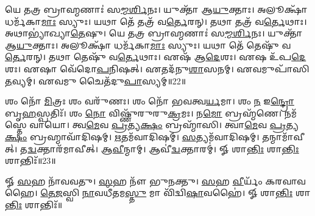 𑌯𑍇 𑌤𑌤𑍍𑌰 𑌬𑍍𑌰𑌾𑌹𑍍𑌮𑌣𑌾𑌃॑ 𑌸\-\ul{𑌮𑍍𑌮}\-\-\ul{𑌰𑍍}\-\mbox{}𑌶𑌿𑌨𑌃। 
𑌯𑍁𑌕𑍍𑌤𑌾᳴ 𑌆\-\ul{𑌯𑍁}\-𑌕𑍍𑌤𑌾𑌃। 
𑌅𑌲𑍂𑌕𑍍𑌷𑌾᳴ 𑌧𑌰𑍍𑌮᳴𑌕𑌾\-\ul{𑌮𑌾𑌃} 𑌸𑍍𑌯𑍁𑌃। 
𑌯𑌥𑌾 𑌤𑍇᳴ 𑌤𑌤𑍍𑌰᳴ 𑌵\-\ul{𑌰𑍍𑌤𑍇}\-𑌰𑌨𑍍। 
𑌤𑌥𑌾 𑌤𑌤𑍍𑌰᳴ 𑌵\-\ul{𑌰𑍍𑌤𑍇}\-𑌥𑌾𑌃। 
𑌅𑌥𑌾𑌭𑍍𑌯𑌾॑𑌖𑍍𑌯𑌾\-\ul{𑌤𑍇}\-𑌷𑍁। 
𑌯𑍇 𑌤𑌤𑍍𑌰 𑌬𑍍𑌰𑌾𑌹𑍍𑌮𑌣𑌾𑌃॑ 𑌸\-\ul{𑌮𑍍𑌮}\-\-\ul{𑌰𑍍}\-\mbox{}𑌶𑌿𑌨𑌃। 
𑌯𑍁𑌕𑍍𑌤𑌾᳴ 𑌆\-\ul{𑌯𑍁}\-𑌕𑍍𑌤𑌾𑌃। 
𑌅𑌲𑍂𑌕𑍍𑌷𑌾᳴ 𑌧𑌰𑍍𑌮᳴𑌕𑌾\-\ul{𑌮𑌾𑌃} 𑌸𑍍𑌯𑍁𑌃। 
𑌯𑌥𑌾 𑌤𑍇᳴ 𑌤𑍇𑌷𑍁᳴ 𑌵\-\ul{𑌰𑍍𑌤𑍇}\-𑌰𑌨𑍍। 
𑌤𑌥𑌾 𑌤𑍇𑌷𑍁᳴ 𑌵\-\ul{𑌰𑍍𑌤𑍇}\-𑌥𑌾𑌃। 
𑌏𑌷᳴ 𑌆\-\ul{𑌦𑍇}\-𑌶𑌃। 
𑌏𑌷 𑌉᳴𑌪\-\ul{𑌦𑍇}\-𑌶𑌃। 
𑌏𑌷𑌾 𑌵𑍇᳴𑌦𑍋\-\ul{𑌪}\-𑌨𑌿𑌷𑌤𑍍। 
𑌏𑌤𑌦᳴𑌨𑍁\-\ul{𑌶𑌾}\-𑌸𑌨𑌮𑍍। 
𑌏𑌵𑌮𑍁𑌪𑌾᳴𑌸𑌿\-\ul{𑌤}\-𑌵𑍍𑌯𑌮𑍍। 
𑌏𑌵𑌮𑍁 𑌚𑍈𑌤᳴𑌦𑍁\-\ul{𑌪𑌾}\-𑌸𑍍𑌯𑌮𑍍॥22॥
\anuvakamend[𑌸𑍍𑌵𑌾𑌧𑍍𑌯𑌾𑌯𑌪𑍍𑌰𑌵𑌚𑌨𑌾𑌭𑍍𑌯𑌾𑌨𑍍𑌨 𑌪𑍍𑌰𑌮᳴𑌦𑌿\-\ul{𑌤}\-𑌵𑍍𑌯𑌂 𑌤𑌾𑌨𑌿 𑌤𑍍𑌵𑌯𑍋᳴𑌪𑌾\-\ul{𑌸𑍍𑌯𑌾}\-𑌨𑌿 𑌸𑍍𑌯𑌾𑌤𑍍𑌤𑍇𑌷𑍁᳴ 𑌵\-\ul{𑌰𑍍𑌤𑍇}\-𑌰\-\ul{𑌨𑍍𑌥𑍍𑌸}\-𑌪𑍍𑌤 𑌚᳴]

𑌶𑌂 𑌨𑍋᳴ \ul{𑌮𑌿}\-𑌤𑍍𑌰𑌃 𑌶𑌂 𑌵𑌰𑍁᳴𑌣𑌃। 
𑌶𑌂 𑌨𑍋᳴ 𑌭𑌵𑌤𑍍𑌵\-\ul{𑌰𑍍𑌯}\-𑌮𑌾। 
𑌶𑌂 \ul{𑌨} 𑌇\-\ul{𑌨𑍍𑌦𑍍𑌰𑍋} 𑌬𑍃\-\ul{𑌹}\-𑌸𑍍𑌪𑌤𑌿𑌃᳴। 
𑌶𑌂 \ul{𑌨𑍋} 𑌵𑌿𑌷𑍍𑌣𑍁᳴𑌰𑍁𑌰𑍁\-\ul{𑌕𑍍𑌰}\-𑌮𑌃। 
𑌨\-\ul{𑌮𑍋} 𑌬𑍍𑌰𑌹𑍍𑌮᳴𑌣𑍇। 
𑌨𑌮᳴𑌸𑍍𑌤𑍇 𑌵𑌾𑌯𑍋। 
𑌤𑍍𑌵\-\ul{𑌮𑍇}\-𑌵 \ul{𑌪𑍍𑌰}\-𑌤𑍍𑌯\-\ul{𑌕𑍍𑌷𑌂} 𑌬𑍍𑌰𑌹𑍍𑌮𑌾᳴𑌸𑌿। 
𑌤𑍍𑌵𑌾\-\ul{𑌮𑍇}\-𑌵 \ul{𑌪𑍍𑌰}\-𑌤𑍍𑌯\-\ul{𑌕𑍍𑌷𑌂} 𑌬𑍍𑌰𑌹𑍍𑌮𑌾𑌵𑌾᳴𑌦𑌿𑌷𑌮𑍍। 
\-\ul{𑌋}\-𑌤𑌮᳴𑌵𑌾𑌦𑌿𑌷𑌮𑍍। 
\-\ul{𑌸}\-𑌤𑍍𑌯𑌮᳴𑌵𑌾𑌦𑌿𑌷𑌮𑍍। 
𑌤𑌨𑍍𑌮𑌾𑌮𑌾᳴𑌵𑍀𑌤𑍍। 
𑌤\-\ul{𑌦𑍍𑌵}\-𑌕𑍍𑌤𑌾𑌰᳴𑌮𑌾𑌵𑍀𑌤𑍍। 
𑌆\-\ul{𑌵𑍀}\-𑌨𑍍𑌮𑌾𑌮𑍍। 
𑌆𑌵𑍀॑\-\ul{𑌦𑍍𑌵}\-𑌕𑍍𑌤𑌾𑌰𑌮𑍍॑। 
𑍐 𑌶𑌾\-\ul{𑌨𑍍𑌤𑌿𑌃} 𑌶𑌾\-\ul{𑌨𑍍𑌤𑌿𑌃} 𑌶𑌾𑌨𑍍𑌤𑌿𑌃᳴॥23॥
\anuvakamend[\-\ul{𑌸}\-𑌤𑍍𑌯𑌮᳴𑌵𑌾𑌦𑌿\-\ul{𑌷𑌂} 𑌪𑌞𑍍𑌚᳴ 𑌚]


\setcounter{anuvakam}{0}
𑍐 \ul{𑌸}\-𑌹 𑌨𑌾᳴𑌵𑌵𑌤𑍁। 
\-\ul{𑌸}\-𑌹 𑌨𑍗᳴ 𑌭𑍁𑌨𑌕𑍍𑌤𑍁। 
\-\ul{𑌸}\-𑌹 \ul{𑌵𑍀}\-𑌰𑍍𑌯𑌂᳴ 𑌕𑌰𑌵𑌾𑌵𑌹𑍈। 
\-\ul{𑌤𑍇}\-\-\ul{𑌜}\-𑌸𑍍𑌵𑌿 \ul{𑌨𑌾}\-𑌵𑌧𑍀᳴𑌤𑌮\-\ul{𑌸𑍍𑌤𑍁} 𑌮𑌾 𑌵𑌿᳴𑌦𑍍𑌵𑌿\-\ul{𑌷𑌾}\-𑌵𑌹𑍈॑। 
𑍐 𑌶𑌾\-\ul{𑌨𑍍𑌤𑌿𑌃} 𑌶𑌾\-\ul{𑌨𑍍𑌤𑌿𑌃} 𑌶𑌾𑌨𑍍𑌤𑌿𑌃᳴॥%


